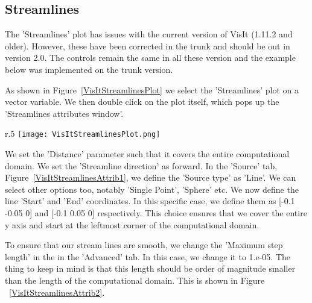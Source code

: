 \subsection{Streamlines}

The 'Streamlines' plot has issues with the current version of VisIt
(1.11.2 and older). However, these have been corrected in the trunk
and should be out in version 2.0. The controls remain the same in all
these version and the example below was implemented on the trunk
version.

As shown in Figure~\ref{VisItStreamlinesPlot} we select the
'Streamlines' plot on a vector variable. We then double click on the
plot itself, which pops up the 'Streamlines attributes window'.

\begin{wrapfigure}{r}{.5\textwidth}
  \center
  \vspace{-10pt}
  \texttt{[image: VisItStreamlinesPlot.png]}
  \caption{Selecting the 'Streamlines' plot on a vector variable}
  \label{VisItStreamlinesPlot}
\end{wrapfigure}

We set the 'Distance' parameter such that it covers the entire
computational domain. We set the 'Streamline direction' as forward. In
the 'Source' tab, Figure~\ref{VisItStreamlinesAttrib1}, we define the
'Source type' as 'Line'. We can select other options too, notably
'Single Point', 'Sphere' etc. We now define the line 'Start' and 'End'
coordinates. In this specific case, we define them as [-0.1 -0.05 0]
and [-0.1 0.05 0] respectively. This choice ensures that we cover the
entire y axis and start at the leftmost corner of the computational
domain.

To ensure that our stream lines are smooth, we change the 'Maximum
step length' in the in the 'Advanced' tab. In this case, we change it
to 1.e-05. The thing to keep in mind is that this length should be
order of magnitude smaller than the length of the computational
domain. This is shown in Figure ~\ref{VisItStreamlinesAttrib2}.



